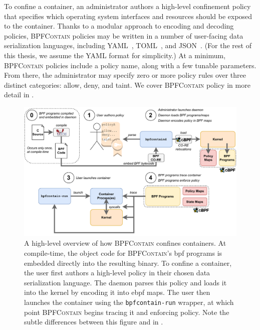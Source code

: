 \documentclass[
  fontsize=12pt,
  titlepage=firstiscover,
  paper=letter,
oneside,
  cleardoublepage=plain,
  parskip=half-,
  DIV=10,
  parindent,
  appendixprefix,
  chapterprefix,
  listof=totoc,
]{scrbook}
\newcommand{\bpfcontain}{\textsc{BPFContain}}
\begin{document}
To confine a container, an administrator authors a high-level confinement policy that
specifies which operating system interfaces and resources should be exposed to the
container.  Thanks to a modular approach to encoding and decoding policies, \bpfcontain{}
policies may be written in a number of user-facing data serialization languages, including
YAML~\cite{yaml}, TOML~\cite{toml}, and JSON~\cite{json}. (For the rest of this thesis, we
assume the YAML format for simplicity.) At a minimum, \bpfcontain{} policies include
a policy name, along with a few tunable parameters. From there, the administrator may
specify zero or more policy rules over three distinct categories: allow, deny, and taint.
We cover \bpfcontain{} policy in more detail in .

\begin{figure}[htpb]
  \centering
  \includegraphics[width=1\linewidth]{figs/bpfcontain/overview.pdf}
  \caption[A high-level overview of how \bpfcontain{} confines containers]{
    A high-level overview of how \bpfcontain{} confines containers.  At compile-time,
    the object code for \bpfcontain{}'s \gls{bpf} programs is embedded directly into the
    resulting binary. To confine a container, the user first authors a high-level policy
    in their chosen data serialization language. The daemon parses this policy and loads
    it into the kernel by encoding it into \gls{ebpf} maps. The user then launches the
    container using the \texttt{bpfcontain-run} wrapper, at which point \bpfcontain{}
    begins tracing it and enforcing policy. Note the subtle differences between this
    figure and  in .
  }\label{fig:bpfcontain-overview}
\end{figure}
\end{document}
